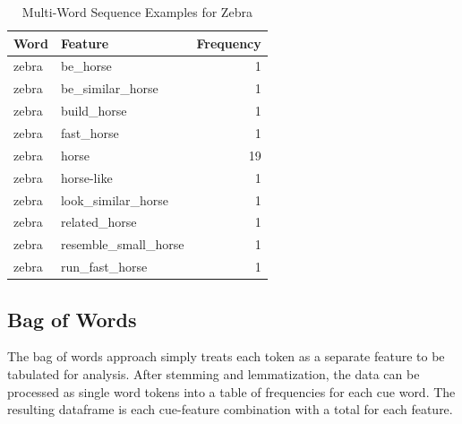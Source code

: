 \documentclass[man]{apa6}
\begin{document}
\begin{table}[t]

\caption{\label{tab:tab4}Multi-Word Sequence Examples for Zebra}
\centering
\begin{tabular}{llr}
\toprule
Word & Feature & Frequency\\
\midrule
zebra & be\_horse & 1\\
zebra & be\_similar\_horse & 1\\
zebra & build\_horse & 1\\
zebra & fast\_horse & 1\\
zebra & horse & 19\\
\addlinespace
zebra & horse-like & 1\\
zebra & look\_similar\_horse & 1\\
zebra & related\_horse & 1\\
zebra & resemble\_small\_horse & 1\\
zebra & run\_fast\_horse & 1\\
\bottomrule
\end{tabular}
\end{table}

\hypertarget{bag-of-words}{%
\subsection{Bag of Words}\label{bag-of-words}}

The bag of words approach simply treats each token as a separate feature to be tabulated for analysis. After stemming and lemmatization, the data can be processed as single word tokens into a table of frequencies for each cue word. The resulting dataframe is each cue-feature combination with a total for each feature.

\scriptsize
\end{document}
